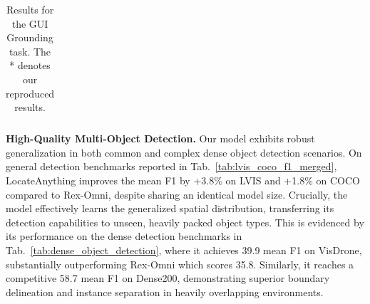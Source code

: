 \documentclass{llmxive}
\begin{document}
\begin{table}[t]
{\begin{tabular}{l|ccccccccccccc}
      \bottomrule
    \end{tabular}%
  }
  \label{tab:gui_grounidng}
\caption{Results for the GUI Grounding task. The * denotes our reproduced results.}
\end{table}

\vspace{+1mm}
\noindent\textbf{High-Quality Multi-Object Detection.}
Our model exhibits robust generalization in both common and complex dense object detection scenarios. On general detection benchmarks reported in Tab.~\ref{tab:lvis_coco_f1_merged}, LocateAnything improves the mean F1 by +3.8\% on LVIS and +1.8\% on COCO compared to Rex-Omni, despite sharing an identical model size. Crucially, the model effectively learns the generalized spatial distribution, transferring its detection capabilities to unseen, heavily packed object types. This is evidenced by its performance on the dense detection benchmarks in Tab.~\ref{tab:dense_object_detection}, where it achieves 39.9 mean F1 on VisDrone, substantially outperforming Rex-Omni which scores 35.8. Similarly, it reaches a competitive 58.7 mean F1 on Dense200, demonstrating superior boundary delineation and instance separation in heavily overlapping environments.
\end{document}
